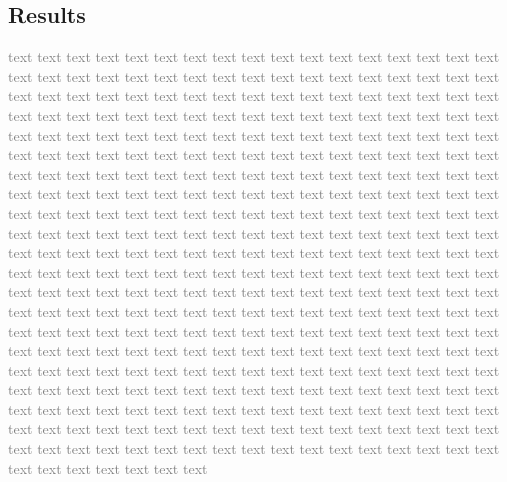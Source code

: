 \documentclass[sigconf]{acmart}
\begin{document}
\subsection{Results}
\textcolor{gray}{
    text text text text text text text text text text text text text text text text text text text text text text text text text text text text text text text text text text text text text text text text text text text text text text text text text text text text text text text text text text text text text text text text text text text text text text text text text text text text text text text text text text text text text text text text text text text text text text text text text text text text text text text text text text text text text text text text text text text text text text text text text text text text text text text text text text text text text text text text text text text text text text text text text text text text text text text text text text text text text text text text text text text text text text text text text text text text text text text text text text text text text text
    text text text text text text text text text text text text text text text text text text text text text text text text text text text text text text text text text text text text text text text text text text text text text text text text text text text text text text text text text text text text text text text text text text text text text text text text text text text text text text text text text text text text text text text text text text text text text text text text text text text text text text text text text text text text text text text text text text text text text text text text text text text text text text text text text text text text text text text text text text text text text text text text text text text text text text text text text text text text text text text text text text text text text text text text text text text text text text text text text text text text text text
}
\end{document}
